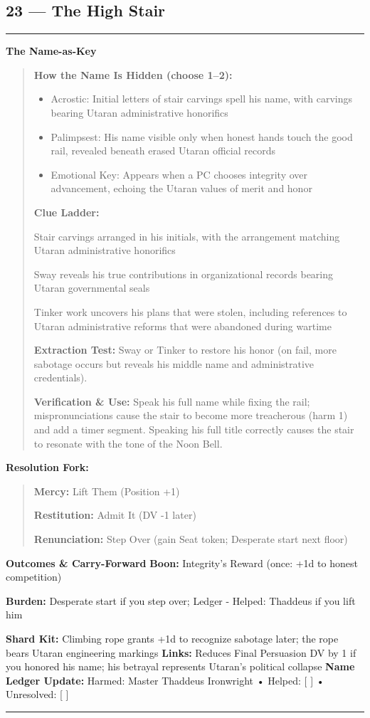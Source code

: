 \documentclass[18pt, letterpaper, twoside]{article}
\newenvironment{floorbox}[1]{%
    \begin{center}
    \begin{minipage}{0.95\textwidth}
    \subsection*{#1}
    \vspace{-0.5em}
    \rule{\textwidth}{0.5pt}
    \vspace{0.5em}
}{%
    \vspace{0.5em}
    \rule{\textwidth}{0.5pt}
    \end{minipage}
    \end{center}
}
\newenvironment{gmnote}[1]{%
    \vspace{0.5em}
    \noindent\textbf{#1}
    \begin{quote}
}{%
    \end{quote}
    \vspace{0.5em}
}
\newenvironment{resolutionbox}{%
    \vspace{0.5em}
    \noindent\textbf{Resolution Fork:}
    \begin{quote}
}{%
    \end{quote}
    \vspace{0.5em}
}
\newcommand{\boon}[1]{\noindent\textbf{Boon:} #1\par}
\newcommand{\burden}[1]{\noindent\textbf{Burden:} #1\par}
\begin{document}
\begin{floorbox}{23 --- The High Stair}
\begin{gmnote}{The Name-as-Key}
\textbf{How the Name Is Hidden (choose 1--2):}
\begin{itemize}[leftmargin=*]
    \item Acrostic: Initial letters of stair carvings spell his name, with carvings bearing Utaran administrative honorifics
    \item Palimpsest: His name visible only when honest hands touch the good rail, revealed beneath erased Utaran official records
    \item Emotional Key: Appears when a PC chooses integrity over advancement, echoing the Utaran values of merit and honor
\end{itemize}

\textbf{Clue Ladder:}
\begin{description}[leftmargin=*, style=unboxed]
    \item[Gentle Nudge:] Stair carvings arranged in his initials, with the arrangement matching Utaran administrative honorifics
    \item[Actionable Lead:] Sway reveals his true contributions in organizational records bearing Utaran governmental seals
    \item[Aha! Proof:] Tinker work uncovers his plans that were stolen, including references to Utaran administrative reforms that were abandoned during wartime
\end{description}

\textbf{Extraction Test:} Sway or Tinker to restore his honor (on fail, more sabotage occurs but reveals his middle name and administrative credentials).

\textbf{Verification \& Use:} Speak his full name while fixing the rail; mispronunciations cause the stair to become more treacherous (harm 1) and add a timer segment. Speaking his full title correctly causes the stair to resonate with the tone of the Noon Bell.
\end{gmnote}

\begin{resolutionbox}
\textbf{Mercy:} Lift Them (Position +1)

\textbf{Restitution:} Admit It (DV -1 later)

\textbf{Renunciation:} Step Over (gain Seat token; Desperate start next floor)
\end{resolutionbox}

\textbf{Outcomes \& Carry-Forward}
\boon{Integrity's Reward (once: +1d to honest competition)}
\burden{Desperate start if you step over; Ledger - Helped: Thaddeus if you lift him}
\textbf{Shard Kit:} Climbing rope grants +1d to recognize sabotage later; the rope bears Utaran engineering markings
\textbf{Links:} Reduces Final Persuasion DV by 1 if you honored his name; his betrayal represents Utaran's political collapse
\textbf{Name Ledger Update:} Harmed: Master Thaddeus Ironwright • Helped: [ ] • Unresolved: [ ]


\end{floorbox}
\end{document}

